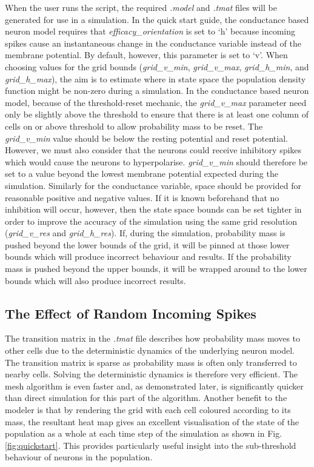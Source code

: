 \documentclass[utf8]{frontiersSCNS} %
\begin{document}
When the user runs the script, the required \textit{.model} and \textit{.tmat} files will be generated for use in a simulation. In the quick start guide, the conductance based neuron model requires that \textit{efficacy\_orientation} is set to `h' because incoming spikes cause an instantaneous change in the conductance variable instead of the membrane potential. By default, however, this parameter is set to `v'. When choosing values for the grid bounds (\textit{grid\_v\_min}, \textit{grid\_v\_max}, \textit{grid\_h\_min}, and \textit{grid\_h\_max}), the aim is to estimate where in state space the population density function might be non-zero during a simulation. In the conductance based neuron model, because of the threshold-reset mechanic, the \textit{grid\_v\_max} parameter need only be slightly above the threshold to ensure that there is at least one column of cells on or above threshold to allow probability mass to be reset. The \textit{grid\_v\_min} value should be below the resting potential and reset potential. However, we must also consider that the neurons could receive inhibitory spikes which would cause the neurons to hyperpolarise. \textit{grid\_v\_min} should therefore be set to a value beyond the lowest membrane potential expected during the simulation. Similarly for the conductance variable, space should be provided for reasonable positive and negative values. If it is known beforehand that no inhibition will occur, however, then the state space bounds can be set tighter in order to improve the accuracy of the simulation using the same grid resolution (\textit{grid\_v\_res} and \textit{grid\_h\_res}). If, during the simulation, probability mass is pushed beyond the lower bounds of the grid, it will be pinned at those lower bounds which will produce incorrect behaviour and results. If the probability mass is pushed beyond the upper bounds, it will be wrapped around to the lower bounds which will also produce incorrect results.\\

\subsection{The Effect of Random Incoming Spikes}
The transition matrix in the \textit{.tmat} file describes how probability mass moves to other cells due to the deterministic dynamics of the underlying neuron model. The transition matrix is sparse as probability mass is often only transferred to nearby cells. Solving the deterministic dynamics is therefore very efficient. The mesh algorithm is even faster and, as demonstrated later, is significantly quicker than direct simulation for this part of the algorithm. Another benefit to the modeler is that by rendering the grid with each cell coloured according to its mass, the resultant heat map gives an excellent visualisation of the state of the population as a whole at each time step of the simulation as shown in Fig. \ref{fig:quickstart}. This provides particularly useful insight into the sub-threshold behaviour of neurons in the population.\\ 
\end{document}
